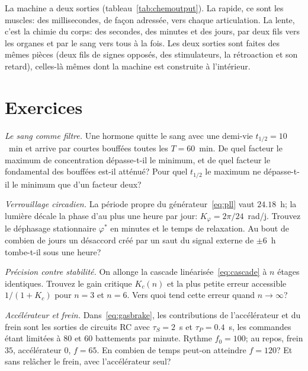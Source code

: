 La machine a deux sorties (tableau~\ref{tab:chemoutput}). La rapide, ce sont les muscles: des millisecondes, de façon adressée, vers chaque articulation. La lente, c'est la chimie du corps: des secondes, des minutes et des jours, par deux fils vers les organes et par le sang vers tous à la fois. Les deux sorties sont faites des mêmes pièces (deux fils de signes opposés, des stimulateurs, la rétroaction et son retard), celles-là mêmes dont la machine est construite à l'intérieur.

\section{Exercices}

\begin{exercise}[\lvlA]
\label{ex:16:1}
\emph{Le sang comme filtre.} Une hormone quitte le sang avec une demi-vie $t_{1/2}=10$~min et arrive par courtes bouffées toutes les $T=60$~min. De quel facteur le maximum de concentration dépasse-t-il le minimum, et de quel facteur le fondamental des bouffées est-il atténué? Pour quel $t_{1/2}$ le maximum ne dépasse-t-il le minimum que d'un facteur deux?
\end{exercise}

\begin{exercise}[\lvlA]
\label{ex:16:2}
\emph{Verrouillage circadien.} La période propre du générateur~\eqref{eq:pll} vaut $24.18$~h; la lumière décale la phase d'au plus une heure par jour: $K_\varphi=2\pi/24$~rad/j. Trouvez le déphasage stationnaire $\varphi^*$ en minutes et le temps de relaxation. Au bout de combien de jours un désaccord créé par un saut du signal externe de $\pm6$~h tombe-t-il sous une heure?
\end{exercise}

\begin{exercise}[\lvlB]
\label{ex:16:3}
\emph{Précision contre stabilité.} On allonge la cascade linéarisée~\eqref{eq:cascade} à $n$ étages identiques. Trouvez le gain critique $K_c(n)$ et la plus petite erreur accessible $1/(1+K_c)$ pour $n=3$ et $n=6$. Vers quoi tend cette erreur quand $n\to\infty$?
\end{exercise}

\begin{exercise}[\lvlB]
\label{ex:16:4}
\emph{Accélérateur et frein.} Dans~\eqref{eq:gasbrake}, les contributions de l'accélérateur et du frein sont les sorties de circuits RC avec $\tau_S=2$~s et $\tau_P=0.4$~s, les commandes étant limitées à $80$ et $60$ battements par minute. Rythme $f_0=100$; au repos, frein $35$, accélérateur $0$, $f=65$. En combien de temps peut-on atteindre $f=120$? Et sans relâcher le frein, avec l'accélérateur seul?
\end{exercise}

